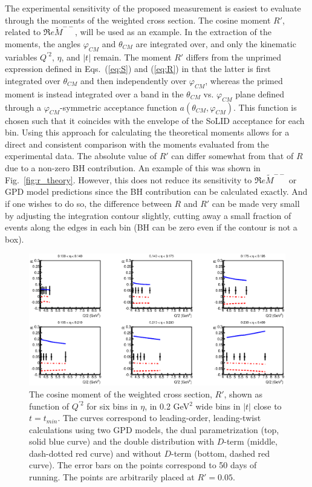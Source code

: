 The experimental sensitivity of the proposed measurement is easiest to
evaluate through the moments of the weighted cross section. The cosine moment
$R'$, related to $\Re e\tilde{M}^{--}$, will be used as an example. In the
extraction of the moments, the angles $\varphi_{CM}$ and $\theta_{CM}$ are
integrated over, and only the kinematic variables $Q^{\prime 2}$, $\eta$, and
$|t|$ remain.
The moment $R'$ differs from the unprimed expression defined in
Eqs.~(\ref{eq:S}) and (\ref{eq:R}) in that the latter is first integrated
over $\theta_{CM}$ and then independently over $\varphi_{CM}$, whereas the
primed moment is instead integrated over a band in the $\theta_{CM}$ vs.
$\varphi_{CM}$ plane defined through a $\varphi_{CM}$-symmetric acceptance
function $a(\theta_{CM},\varphi_{CM})$. This function is chosen such that it
coincides with the envelope of the SoLID acceptance for each bin. Using this
approach for calculating the theoretical moments allows for a direct and 
consistent comparison with the moments evaluated from the experimental data.
The absolute value of $R'$ can differ somewhat from that of $R$ due to a
non-zero BH contribution. An example of this was shown in
Fig.~\ref{fig:r_theory}. However, this does not reduce its sensitivity to
$\Re e\tilde{M}^{--}$ or GPD model predictions since the BH contribution
can be calculated exactly.
And if one wishes to do so, the difference between $R$ and $R'$ can be made
very small by adjusting the integration contour slightly, cutting away a small
fraction of events along the edges in each bin (BH can be zero even if the
contour is not a box).

\begin{figure}[t]
\includegraphics[scale=0.8]{R_etabin.eps}
\caption{\small{
The cosine moment of the weighted cross section, $R'$, shown as function of
$Q^{\prime 2}$ for six bins in $\eta$, in 0.2 GeV$^2$ wide bins in $|t|$
close to $t=t_{min}$. The curves correspond to leading-order, leading-twist 
calculations using two GPD models, the dual parametrization
\cite{Polyakov:2002wz,Guzey:2006xi,Guzey:2008ys,Polyakov:2008aa} (top, solid
blue curve) and the double distribution \cite{Radyushkin:1998es} with $D$-term
(middle, dash-dotted red curve) and without $D$-term (bottom, dashed red
curve). The error bars on the points correspond to 50 days of running.
The points are arbitrarily placed at $R' = 0.05$.}}
\label{fig:R_etabin}
\end{figure}

